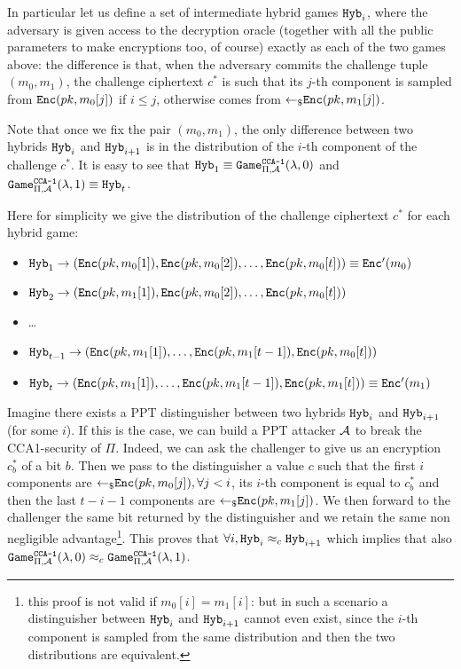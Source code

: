 \begin{enumerate}[(a)]
\begin{enumerate}[(i)]
\begin{solution}
			In particular let us define a set of intermediate hybrid games $\texttt{Hyb}_i$, where the adversary is given access to the decryption oracle (together with all the public parameters to make encryptions too, of course) exactly as each of the two games above: the difference is that, when the adversary commits the challenge tuple $(m_0, m_1)$, the challenge ciphertext $c^*$ is such that its $j$-th component is sampled from $\texttt{Enc}(pk, m_0[j])$ if $i \le j$, otherwise comes from ${\leftarrow_\$} \texttt{Enc}(pk, m_1[j])$.
			
			Note that once we fix the pair $(m_0, m_1)$, the only difference between two hybrids $\texttt{Hyb}_i$ and $\texttt{Hyb}_{i+1}$ is in the distribution of the $i$-th component of the challenge $c^*$. It is easy to see that $\texttt{Hyb}_1 \equiv \texttt{Game}_{\Pi, \mathcal{A}}^\texttt{CCA-1}(\lambda, 0)$ and $\texttt{Game}_{\Pi, \mathcal{A}}^\texttt{CCA-1}(\lambda, 1) \equiv \texttt{Hyb}_t$.
			
			Here for simplicity we give the distribution of the challenge ciphertext $c^*$ for each hybrid game:
			\begin{itemize}
				\item $\texttt{Hyb}_1 \rightarrow (\texttt{Enc}(pk, m_0[1]), \texttt{Enc}(pk, m_0[2]), \dots, \texttt{Enc}(pk, m_0[t])) \equiv \texttt{Enc}'(m_0)$
				\item $\texttt{Hyb}_2 \rightarrow (\texttt{Enc}(pk, m_1[1]), \texttt{Enc}(pk, m_0[2]), \dots, \texttt{Enc}(pk, m_0[t]))$
				\item \dots
				\item $\texttt{Hyb}_{t-1} \rightarrow (\texttt{Enc}(pk, m_1[1]), \dots, \texttt{Enc}(pk, m_1[t-1]), \texttt{Enc}(pk, m_0[t]))$
				\item $\texttt{Hyb}_t \rightarrow (\texttt{Enc}(pk, m_1[1]), \dots, \texttt{Enc}(pk, m_1[t-1]), \texttt{Enc}(pk, m_1[t])) \equiv \texttt{Enc}'(m_1)$
			\end{itemize}

		Imagine there exists a PPT distinguisher between two hybrids $\texttt{Hyb}_i$ and $\texttt{Hyb}_{i+1}$ (for some $i$). If this is the case, we can build a PPT attacker $\mathcal{A}$ to break the CCA1-security of $\Pi$. Indeed, we can ask the challenger to give us an encryption $c_b^*$ of a bit $b$. Then we pass to the distinguisher a value $c$ such that the first $i$ components are ${\leftarrow_\$} \texttt{Enc}(pk, m_0[j]), \forall j < i$, its $i$-th component is equal to $c_b^*$ and then the last $t-i-1$ components are ${\leftarrow_\$} \texttt{Enc}(pk, m_1[j])$. We then forward to the challenger the same bit returned by the distinguisher and we retain the same non negligible advantage\footnote{this proof is not valid if $m_0[i] = m_1[i]$: but in such a scenario a distinguisher between $\texttt{Hyb}_i$ and $\texttt{Hyb}_{i+1}$ cannot even exist, since the $i$-th component is sampled from the same distribution and then the two distributions are equivalent.}. This proves that $\forall i, \texttt{Hyb}_i \approx_c \texttt{Hyb}_{i+1}$ which implies that also $\texttt{Game}_{\Pi, \mathcal{A}}^\texttt{CCA-1}(\lambda, 0) \approx_c \texttt{Game}_{\Pi, \mathcal{A}}^\texttt{CCA-1}(\lambda, 1)$.
		\end{solution}
		

\end{enumerate}
\end{enumerate}
